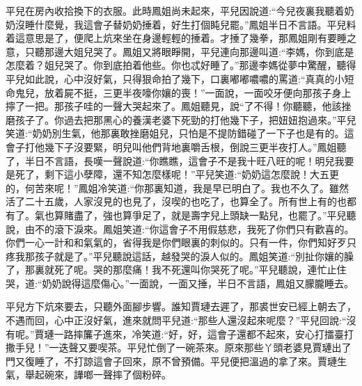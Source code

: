 \begin{parag}
    平兒在房內收拾換下的衣服。此時鳳姐尚未起來，平兒因說道:“今兒夜裏我聽着奶奶沒睡什麼覺，我這會子替奶奶捶着，好生打個盹兒罷。”鳳姐半日不言語。平兒料着這意思是了，便爬上炕來坐在身邊輕輕的捶着。才捶了幾拳，那鳳姐剛有要睡之意，只聽那邊大姐兒哭了。鳳姐又將眼睜開，平兒連向那邊叫道:“李媽，你到底是怎麼着？姐兒哭了。你到底拍着他些。你也忒好睡了。”那邊李媽從夢中驚醒，聽得平兒如此說，心中沒好氣，只得狠命拍了幾下，口裏嘟嘟噥噥的罵道:“真真的小短命鬼兒，放着屍不挺，三更半夜嚎你孃的喪！”一面說，一面咬牙便向那孩子身上擰了一把。那孩子哇的一聲大哭起來了。鳳姐聽見，說“了不得！你聽聽，他該挫磨孩子了。你過去把那黑心的養漢老婆下死勁的打他幾下子，把妞妞抱過來。”平兒笑道:“奶奶別生氣，他那裏敢挫磨姐兒，只怕是不提防錯碰了一下子也是有的。這會子打他幾下子沒要緊，明兒叫他們背地裏嚼舌根，倒說三更半夜打人。”鳳姐聽了，半日不言語，長嘆一聲說道:“你瞧瞧，這會子不是我十旺八旺的呢！明兒我要是死了，剩下這小孽障，還不知怎麼樣呢！”平兒笑道:“奶奶這怎麼說！大五更的，何苦來呢！”鳳姐冷笑道:“你那裏知道，我是早已明白了。我也不久了。雖然活了二十五歲，人家沒見的也見了，沒喫的也吃了，也算全了。所有世上有的也都有了。氣也算賭盡了，強也算爭足了，就是壽字兒上頭缺一點兒，也罷了。”平兒聽說，由不的滾下淚來。鳳姐笑道:“你這會子不用假慈悲，我死了你們只有歡喜的。你們一心一計和和氣氣的，省得我是你們眼裏的刺似的。只有一件，你們知好歹只疼我那孩子就是了。”平兒聽說這話，越發哭的淚人似的。鳳姐笑道:“別扯你孃的臊了，那裏就死了呢。哭的那麼痛！我不死還叫你哭死了呢。”平兒聽說，連忙止住哭，道:“奶奶說得這麼傷心。”一面說，一面又捶，半日不言語，鳳姐又朦朧睡去。
\end{parag}


\begin{parag}
    平兒方下炕來要去，只聽外面腳步響。誰知賈璉去遲了，那裘世安已經上朝去了，不遇而回，心中正沒好氣，進來就問平兒道:“那些人還沒起來呢麼？”平兒回說:“沒有呢。”賈璉一路摔簾子進來，冷笑道:“好，好，這會子還都不起來，安心打擂臺打撒手兒！”一迭聲又要喫茶。平兒忙倒了一碗茶來。原來那些丫頭老婆見賈璉出了門又復睡了，不打諒這會子回來，原不曾預備。平兒便把溫過的拿了來。賈璉生氣，舉起碗來，譁啷一聲摔了個粉碎。
\end{parag}


